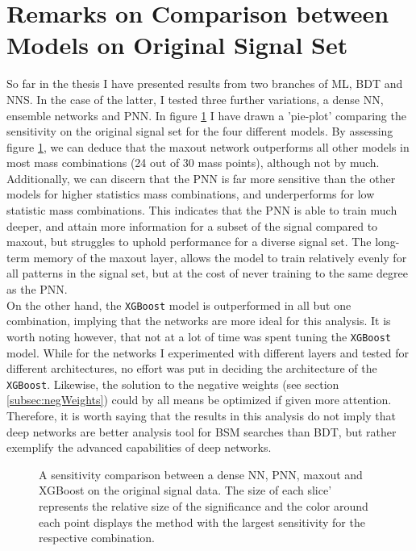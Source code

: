 \section{Remarks on Comparison between Models on Original Signal Set}
So far in the thesis I have presented results from two branches of \ac{ML}, \acf{BDT} and \acf{NNS}. In the case of the latter, I tested
three further variations, a dense \ac{NN}, ensemble networks and \ac{PNN}. In figure \ref{fig:GenPlussXGB} I have drawn a 'pie-plot' comparing 
the sensitivity on the original signal set for the four different models. By assessing figure \ref{fig:GenPlussXGB}, we can deduce that the 
maxout network outperforms all other models in most mass combinations (24 out of 30 mass points), although not by much. Additionally, we can discern 
that the \ac{PNN} is far more sensitive than the other models for higher statistics mass combinations, and underperforms for low statistic mass combinations.
This indicates that the \ac{PNN} is able to train much deeper, and attain more information for a subset of the signal compared to maxout, but struggles to uphold 
performance for a diverse signal set. The long-term memory of the maxout layer, allows the model to train relatively evenly for all patterns in the signal set, but 
at the cost of never training to the same degree as the \ac{PNN}.
\\
On the other hand, the \verb!XGBoost! model is outperformed in all but one combination, implying that the networks are more ideal for this analysis. 
It is worth noting however, that not at a lot of time was spent tuning the \verb!XGBoost! model. While for the networks I experimented with different layers and 
tested for different architectures, no effort was put in deciding the architecture of the \verb!XGBoost!. Likewise, the solution to the negative weights (see 
section \ref{subsec:negWeights}) could by all means be optimized if given more attention. Therefore, it is worth saying that the results in this analysis
do not imply that deep networks are better analysis tool for \ac{BSM} searches than \ac{BDT}, but rather exemplify the advanced capabilities of deep networks.
\begin{figure}
    \caption[A sensitivity comparison between a dense \acs{NN}, \acs{PNN}, maxout and XGBoost on the original 
    signal data.]{A sensitivity comparison between a dense \ac{NN}, \ac{PNN}, maxout and XGBoost on the original 
    signal data. The size of each slice' represents the relative size of the significance and the color around each 
    point displays the method with the largest sensitivity for the respective combination.}
    \label{fig:GenPlussXGB}
\end{figure}
